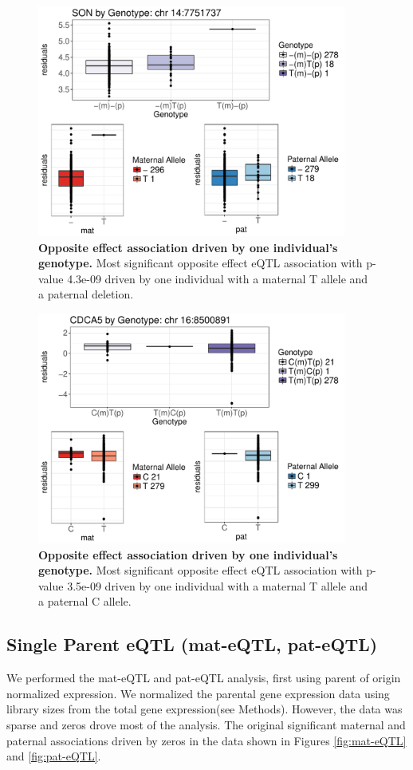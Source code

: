\begin{figure}[!htb]
\centering \includegraphics[width=4in]{img/ch04/fig-02-oeQTL.pdf}
\caption[Opposite effect association with \emph{SON} driven by one individual's genotype.]{\textbf{Opposite effect association driven by one individual's genotype.} Most significant opposite effect eQTL association with p-value 4.3e-09 driven by one individual with a maternal T allele and a paternal deletion.}
\label{fig:oeQTL2}
\end{figure}

\begin{figure}[!htb]
\centering \includegraphics[width=4in]{img/ch04/fig-03-oeQTL.pdf}
\caption[Opposite effect association with \emph{CDCA5} driven by one individual's genotype.]{\textbf{Opposite effect association driven by one individual's genotype.} Most significant opposite effect eQTL association with p-value 3.5e-09 driven by one individual with a maternal T allele and a paternal C allele.}
\label{fig:oeQTL3}
\end{figure}


\subsection{Single Parent eQTL (mat-eQTL, pat-eQTL)}\label{Single Parent eQTL (mat-eQTL, pat-eQTL)} 
We performed the mat-eQTL and pat-eQTL analysis, first using parent of origin normalized expression. We normalized the parental gene expression data using library sizes from the total gene expression(see Methods). However, the data was sparse and zeros drove most of the analysis. The original significant maternal and paternal associations driven by zeros in the data shown in Figures \ref{fig:mat-eQTL} and \ref{fig:pat-eQTL}. 

